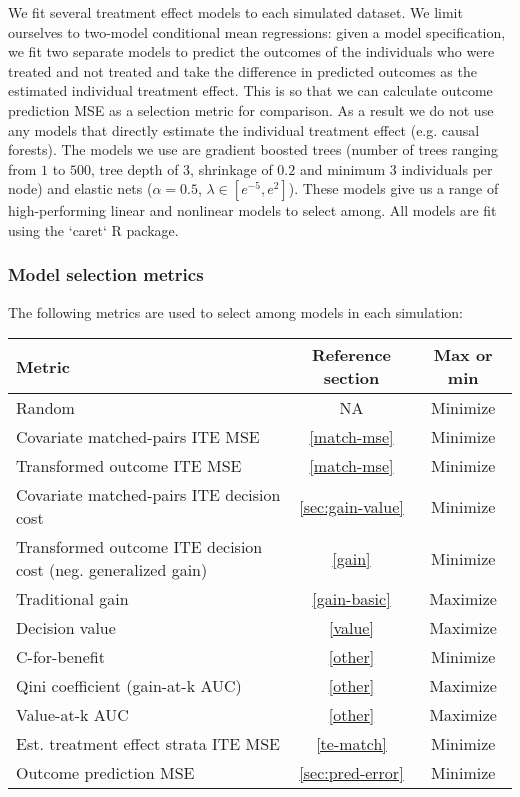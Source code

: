 We fit several treatment effect models to each simulated dataset. We limit ourselves to two-model conditional mean regressions: given a model specification, we fit two separate models to predict the outcomes of the individuals who were treated and not treated and take the difference in predicted outcomes as the estimated individual treatment effect. This is so that we can calculate outcome prediction MSE as a selection metric for comparison. As a result we do not use any models that directly estimate the individual treatment effect (e.g. causal forests). The models we use are gradient boosted trees (number of trees ranging from $1$ to $500$, tree depth of $3$, shrinkage of $0.2$ and minimum $3$ individuals per node) and elastic nets ($\alpha=0.5$, $\lambda \in [e^{-5}, e^2]$). These models give us a range of high-performing linear and nonlinear models to select among. All models are fit using the `caret` R package.

\subsubsection{Model selection metrics}

The following metrics are used to select among models in each simulation:

\begin{center}
\begin{tabular}{|m{6cm}|c|c|}
	\hline
	 Metric & Reference section & Max or min \\
	 \hline
	 Random & NA & Minimize \\
	 Covariate matched-pairs ITE MSE & \ref{match-mse} & Minimize \\
	 Transformed outcome ITE MSE & \ref{match-mse} & Minimize \\
	 Covariate matched-pairs ITE decision cost &  \ref{sec:gain-value} & Minimize \\
	 Transformed outcome ITE decision cost (neg. generalized gain) &  \ref{gain} & Minimize \\
	 Traditional gain &  \ref{gain-basic} & Maximize \\ 
	 Decision value &  \ref{value} & Maximize \\
	 C-for-benefit &  \ref{other} & Minimize \\
	 Qini coefficient (gain-at-k AUC) &  \ref{other} & Maximize \\
	 Value-at-k AUC &  \ref{other} & Maximize \\
	 Est. treatment effect strata ITE MSE &  \ref{te-match} & Minimize \\
	 Outcome prediction MSE &  \ref{sec:pred-error} & Minimize \\
	 \hline
\end{tabular}
\end{center}

